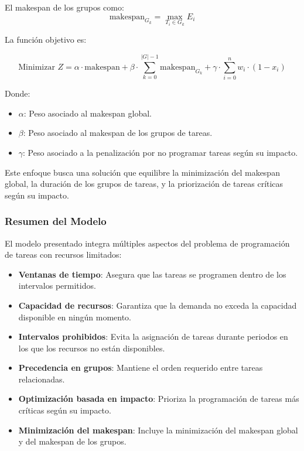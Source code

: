 \documentclass{article}
\begin{document}
El makespan de los grupos como:
\[
\text{makespan}_{G_k} = \max_{T_i \in G_k} E_i
\]


La función objetivo es:

\[
\text{Minimizar } Z = \alpha \cdot \text{makespan} + \beta \cdot \sum_{k=0}^{|G|-1} \text{makespan}_{G_k} + \gamma \cdot \sum_{i=0}^{n} w_i \cdot (1 - x_i)
\]

Donde:

\begin{itemize}
    \item \( \alpha \): Peso asociado al makespan global.
    \item \( \beta \): Peso asociado al makespan de los grupos de tareas.
    \item \( \gamma \): Peso asociado a la penalización por no programar tareas según su impacto.
\end{itemize}

Este enfoque busca una solución que equilibre la minimización del makespan global, la duración de los grupos de tareas, y la priorización de tareas críticas según su impacto.

\vspace{0.5cm}

\subsubsection{Resumen del Modelo}

El modelo presentado integra múltiples aspectos del problema de programación de tareas con recursos limitados:

\begin{itemize}
    \item \textbf{Ventanas de tiempo}: Asegura que las tareas se programen dentro de los intervalos permitidos.
    \item \textbf{Capacidad de recursos}: Garantiza que la demanda no exceda la capacidad disponible en ningún momento.
    \item \textbf{Intervalos prohibidos}: Evita la asignación de tareas durante periodos en los que los recursos no están disponibles.
    \item \textbf{Precedencia en grupos}: Mantiene el orden requerido entre tareas relacionadas.
    \item \textbf{Optimización basada en impacto}: Prioriza la programación de tareas más críticas según su impacto.
    \item \textbf{Minimización del makespan}: Incluye la minimización del makespan global y del makespan de los grupos.
\end{itemize}
\end{document}
